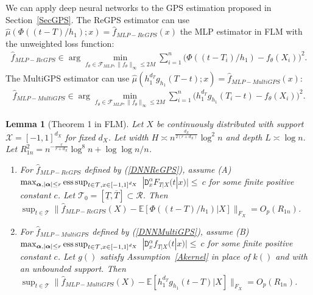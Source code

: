 \documentclass[lettersize, 12pt]{article}
\newtheorem{lemma}{Lemma}
\begin{document}
We can apply deep neural networks to the GPS estimation proposed in Section~\ref{SecGPS}.
The ReGPS estimator can use $\hat\mu\left(\Phi((t-T)/h_1); x\right) = \hat f_{MLP-ReGPS}(x)$ the MLP estimator in FLM with the unweighted loss function:
\begin{align}
\hat f_{MLP-ReGPS} \in \arg\min_{f_\theta \in\mathcal{F}_{MLP}, \|f_\theta\|_\infty \leq 2M} \sum_{i=1}^n \big(\Phi((t-T_i)/h_1) - f_\theta(X_i)\big)^2.
\label{DNNReGPS}
\end{align}
The MultiGPS estimator can use $\hat\mu\left(h_1^{d_T} g_{h_1}(T-t); x\right) = \hat f_{MLP-MultiGPS}(x)$:
\begin{align}
\hat f_{MLP-MultiGPS} \in \arg\min_{f_\theta \in\mathcal{F}_{MLP}, \|f_\theta\|_\infty \leq 2M} \sum_{i=1}^n \big(h_1^{d_T} g_{h_1}(T_i-t) - f_\theta(X_i)\big)^2.
\label{DNNMultiGPS}
\end{align}


\begin{lemma}[Theorem 1 in FLM]
Let $X$ be continuously distributed with support $\mathcal{X} = [-1,1]^{d_X}$ for fixed $d_X$.
Let width $H \asymp n^{\frac{{d_X}}{2(r+{d_X})}}\log^2n$ and depth $L\asymp \log n$.
Let $R_{1n}^2 = n^{-\frac{r}{r+d_X}}\log^8n  +\log\log n/n$. 
\begin{enumerate}
\item[(a)]  
For $\hat f_{MLP-ReGPS}$ defined by (\ref{DNNReGPS}), assume 
(A)~$\max_{\bm{\alpha},|\bm{\alpha}|\leq r} {\rm ess}\sup_{t\in\mathcal{T}, x\in[-1,1]^{d_X}} $
$|\mathtt{D}_x^{\alpha} F_{T|X}(t|x) | \leq~c$ for some finite positive constant $c$.
Let $\mathcal{T}_0 = [\underline{T}, \overline{T}]\subset\mathcal{R}$.
Then 
$\sup_{t \in\mathcal{T}}\big\| \hat f_{MLP-ReGPS}(X) - \mathbb{E}[\Phi((t-T)/h_1)|X] \big\|_{F_X} = O_p(R_{1n})$.

\item[(b)]
For $\hat f_{MLP-MultiGPS}$ defined by (\ref{DNNMultiGPS}), 
assume 
(B)~$\max_{\bm{\alpha},|\bm{\alpha}|\leq r} {\rm ess}\sup_{t\in\mathcal{T}, x\in[-1,1]^{d_X}}$ $|\mathtt{D}_x^{\alpha} f_{T|X}(t|x) | \leq~c$ for some finite positive constant $c$.
Let $g()$ satisfy Assumption~\ref{Akernel} in place of $k()$ and with an unbounded support. 
Then $\sup_{t \in\mathcal{T}}\big\| \hat f_{MLP-MultiGPS}(X) - \mathbb{E}[ h_1^{d_T} g_{h_1}(t-T)|X] \big\|_{F_X} = O_p(R_{1n})$. 
 
 \end{enumerate}

\label{LDNNMultiGPS}
\end{lemma}
 
\end{document}
